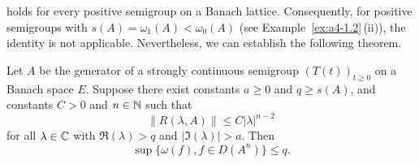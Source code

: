 holds for every positive semigroup on a Banach lattice. 
Consequently, for positive semigroups with $s(A) = \omega_1(A) < \omega_{0}(A)$ (see Example~\ref{ex:a4-1.2}\,(ii)), the identity  is not applicable. 
Nevertheless, we can establish the following theorem.
\begin{theorem}\label{thm:a4-1.9}
Let $A$ be the generator of a strongly continuous semigroup $(T(t))_{t \geq 0}$ on a Banach space $E$. 
Suppose there exist constants $a \geq 0$ and $q \geq s(A)$, and constants $C > 0$ and $n \in \mathbb{N}$ such that 
\[
    \| R(\lambda, A) \| \leq C | \lambda |^{n-2}
\]
for all $\lambda \in \mathbb{C}$ with $\Re(\lambda) > q$ and $| \Im(\lambda) | > a$. 
Then
\[
    \sup \{ \omega(f),  f \in D(A^n) \} \leq q.
\]
\end{theorem}
